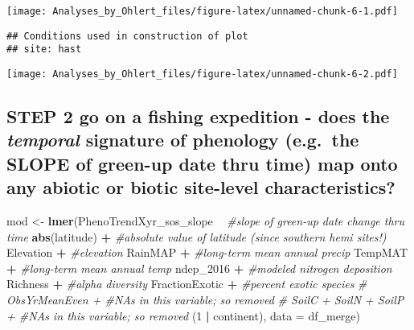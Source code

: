 \documentclass[
]{article}
\newenvironment{Shaded}{\begin{snugshade}}{\end{snugshade}}
\newcommand{\CommentTok}[1]{\textcolor[rgb]{0.56,0.35,0.01}{\textit{#1}}}
\newcommand{\DataTypeTok}[1]{\textcolor[rgb]{0.13,0.29,0.53}{#1}}
\newcommand{\DecValTok}[1]{\textcolor[rgb]{0.00,0.00,0.81}{#1}}
\newcommand{\KeywordTok}[1]{\textcolor[rgb]{0.13,0.29,0.53}{\textbf{#1}}}
\newcommand{\NormalTok}[1]{#1}
\newcommand{\OperatorTok}[1]{\textcolor[rgb]{0.81,0.36,0.00}{\textbf{#1}}}
\newcommand{\StringTok}[1]{\textcolor[rgb]{0.31,0.60,0.02}{#1}}
\begin{document}
\texttt{[image: Analyses\_by\_Ohlert\_files/figure-latex/unnamed-chunk-6-1.pdf]}

\begin{verbatim}
## Conditions used in construction of plot
## site: hast
\end{verbatim}

\texttt{[image: Analyses\_by\_Ohlert\_files/figure-latex/unnamed-chunk-6-2.pdf]}

\hypertarget{step-2-go-on-a-fishing-expedition---does-the-temporal-signature-of-phenology-e.g.-the-slope-of-green-up-date-thru-time-map-onto-any-abiotic-or-biotic-site-level-characteristics}{%
\subsection{\texorpdfstring{STEP 2 go on a fishing expedition - does the
\emph{temporal} signature of phenology (e.g.~the SLOPE of green-up date
thru time) map onto any abiotic or biotic site-level
characteristics?}{STEP 2 go on a fishing expedition - does the temporal signature of phenology (e.g.~the SLOPE of green-up date thru time) map onto any abiotic or biotic site-level characteristics?}}\label{step-2-go-on-a-fishing-expedition---does-the-temporal-signature-of-phenology-e.g.-the-slope-of-green-up-date-thru-time-map-onto-any-abiotic-or-biotic-site-level-characteristics}}

\begin{Shaded}
\begin{Highlighting}[]
\NormalTok{mod <-}\StringTok{ }\KeywordTok{lmer}\NormalTok{(PhenoTrendXyr_sos_slope }\OperatorTok{~}\StringTok{ }\CommentTok{#slope of green-up date change thru time}
\StringTok{              }\KeywordTok{abs}\NormalTok{(latitude) }\OperatorTok{+}\StringTok{ }\CommentTok{#absolute value of latitude (since southern hemi sites!)}
\StringTok{              }\NormalTok{Elevation }\OperatorTok{+}\StringTok{ }\CommentTok{#elevation}
\StringTok{              }\NormalTok{RainMAP }\OperatorTok{+}\StringTok{ }\CommentTok{#long-term mean annual precip}
\StringTok{              }\NormalTok{TempMAT }\OperatorTok{+}\StringTok{ }\CommentTok{#long-term mean annual temp}
\StringTok{              }\NormalTok{ndep_}\DecValTok{2016} \OperatorTok{+}\StringTok{ }\CommentTok{#modeled nitrogen deposition}
\StringTok{              }\NormalTok{Richness }\OperatorTok{+}\StringTok{ }\CommentTok{#alpha diversity}
\StringTok{              }\NormalTok{FractionExotic }\OperatorTok{+}\StringTok{  }\CommentTok{#percent exotic species}
\StringTok{              }\CommentTok{# ObsYrMeanEven + #NAs in this variable; so removed}
\StringTok{              }\CommentTok{# SoilC + SoilN + SoilP + #NAs in this variable; so removed}
\StringTok{              }\NormalTok{(}\DecValTok{1} \OperatorTok{|}\StringTok{ }\NormalTok{continent),}
              \DataTypeTok{data =}\NormalTok{ df_merge)}
\end{Highlighting}
\end{Shaded}
\end{document}
